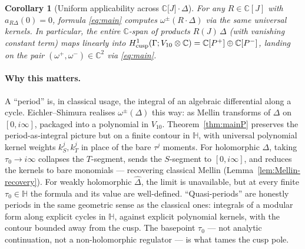 \documentclass[11pt,letterpaper]{article}
\newtheorem{corollary}[theorem]{Corollary}
\newcommand{\HH}{\mathbb{H}}
\newcommand{\CC}{\mathbb{C}}
\newcommand{\Dhat}{\widehat{\Delta}}
\begin{document}
\begin{corollary}[Uniform applicability across $\CC\lbrack J\rbrack\cdot\Delta$]\label{cor:RJ}
For any $R \in \CC[J]$ with $a_{R\Delta}(0) = 0$, formula \eqref{eq:main}
computes $\omega^\pm(R\cdot\Delta)$ via the same universal kernels.  In
particular, the entire $\CC$-span of products $R(J)\,\Delta$ (with
vanishing constant term) maps linearly into
$H^1_{\rm cusp}(\Gamma; V_{10}\otimes\CC) = \CC[P^+]\oplus\CC[P^-]$,
landing on the pair $(\omega^+,\omega^-) \in \CC^2$ via \eqref{eq:main}.
\end{corollary} %


\paragraph{Why this matters.}
A ``period'' is, in classical usage, the integral of an algebraic
differential along a cycle.  Eichler--Shimura realises
$\omega^\pm(\Delta)$ this way: as Mellin transforms of $\Delta$ on
$[0, i\infty]$, packaged into a polynomial in $V_{10}$.
Theorem~\ref{thm:mainP} preserves the period-as-integral picture but on
a finite contour in $\HH$, with universal polynomial kernel weights
$k_S^j, k_T^j$ in place of the bare $\tau^j$ moments.  For holomorphic
$\Delta$, taking $\tau_0 \to i\infty$ collapses the $T$-segment, sends
the $S$-segment to $[0, i\infty]$, and reduces the kernels to bare
monomials --- recovering classical Mellin
(Lemma~\ref{lem:Mellin-recovery}).  For weakly holomorphic $\Dhat$, the
limit is unavailable, but at every finite $\tau_0 \in \HH$ the formula
and its value are well-defined.  ``Quasi-periods'' are honestly periods
in the same geometric sense as the classical ones: integrals of a
modular form along explicit cycles in $\HH$, against explicit
polynomial kernels, with the contour bounded away from the cusp.  The
basepoint $\tau_0$ --- not analytic continuation, not a non-holomorphic
regulator --- is what tames the cusp pole.
\end{document}

